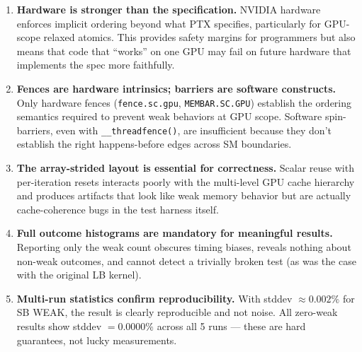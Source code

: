 \documentclass[a4paper]{article}
\begin{document}
\begin{enumerate}
  \item \textbf{Hardware is stronger than the specification.}
    NVIDIA hardware enforces implicit ordering beyond what PTX specifies, particularly for GPU-scope relaxed atomics. This provides safety margins for programmers but also means that code that ``works'' on one GPU may fail on future hardware that implements the spec more faithfully.

  \item \textbf{Fences are hardware intrinsics; barriers are software constructs.}
    Only hardware fences (\texttt{fence.sc.gpu}, \texttt{MEMBAR.SC.GPU}) establish the ordering semantics required to prevent weak behaviors at GPU scope. Software spin-barriers, even with \texttt{\_\_threadfence()}, are insufficient because they don't establish the right happens-before edges across SM boundaries.

  \item \textbf{The array-strided layout is essential for correctness.}
    Scalar reuse with per-iteration resets interacts poorly with the multi-level GPU cache hierarchy and produces artifacts that look like weak memory behavior but are actually cache-coherence bugs in the test harness itself.

  \item \textbf{Full outcome histograms are mandatory for meaningful results.}
    Reporting only the weak count obscures timing biases, reveals nothing about non-weak outcomes, and cannot detect a trivially broken test (as was the case with the original LB kernel).

  \item \textbf{Multi-run statistics confirm reproducibility.}
    With stddev $\approx 0.002\%$ for SB WEAK, the result is clearly reproducible and not noise. All zero-weak results show stddev $= 0.0000\%$ across all 5 runs — these are hard guarantees, not lucky measurements.
\end{enumerate}



\end{document}
